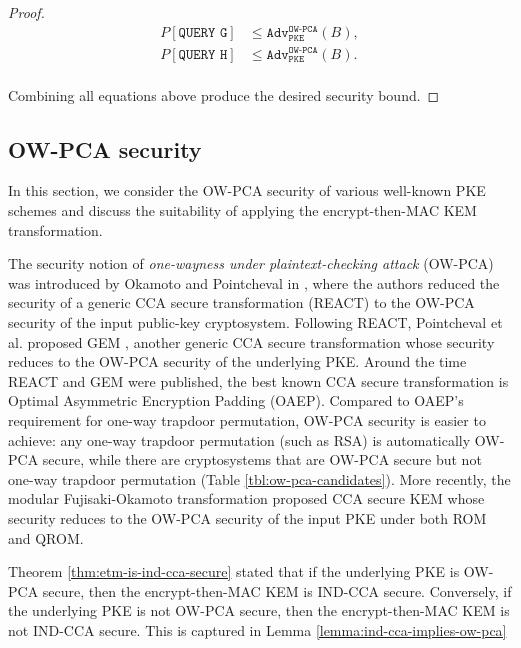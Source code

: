 \documentclass[runningheads]{llncs}
\newcommand{\pke}{\texttt{PKE}}
\newcommand{\adv}{\texttt{Adv}}
\begin{document}
\begin{proof}
    \begin{equation*}
        \begin{aligned}
            P\left[\texttt{QUERY G}\right] &\leq \adv^\texttt{OW-PCA}_\pke(B), \\
            P\left[\texttt{QUERY H}\right] &\leq \adv^\texttt{OW-PCA}_\pke(B). \\
        \end{aligned}
    \end{equation*}

    Combining all equations above produce the desired security bound.
\end{proof}

\subsection{OW-PCA security}\label{sec:ow-pca-security}
In this section, we consider the OW-PCA security of various well-known PKE schemes and discuss the suitability of applying the encrypt-then-MAC KEM transformation. 

The security notion of \textit{one-wayness under plaintext-checking attack} (OW-PCA) was introduced by Okamoto and Pointcheval in \cite{DBLP:conf/ctrsa/OkamotoP01}, where the authors reduced the security of a generic CCA secure transformation (REACT) to the OW-PCA security of the input public-key cryptosystem. Following REACT, Pointcheval et al. proposed GEM \cite{DBLP:conf/ctrsa/CoronHJPPT02}, another generic CCA secure transformation whose security reduces to the OW-PCA security of the underlying PKE. Around the time REACT and GEM were published, the best known CCA secure transformation is Optimal Asymmetric Encryption Padding (OAEP)\cite{DBLP:conf/eurocrypt/BellareR94}. Compared to OAEP's requirement for one-way trapdoor permutation, OW-PCA security is easier to achieve: any one-way trapdoor permutation (such as RSA) is automatically OW-PCA secure, while there are cryptosystems that are OW-PCA secure but not one-way trapdoor permutation (Table \ref{tbl:ow-pca-candidates}). More recently, the modular Fujisaki-Okamoto transformation \cite{DBLP:conf/tcc/HofheinzHK17} proposed CCA secure KEM whose security reduces to the OW-PCA security of the input PKE under both ROM and QROM.

Theorem \ref{thm:etm-is-ind-cca-secure} stated that if the underlying PKE is OW-PCA secure, then the encrypt-then-MAC KEM is IND-CCA secure. Conversely, if the underlying PKE is not OW-PCA secure, then the encrypt-then-MAC KEM is not IND-CCA secure. This is captured in Lemma \ref{lemma:ind-cca-implies-ow-pca}
\end{document}
